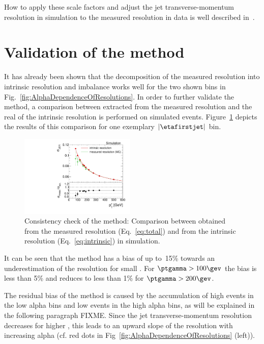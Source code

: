 How to apply these scale factors and adjust the jet transverse-momentum resolution in simulation to the measured resolution in data is well described in~\cite{bib:Matthias_Thesis}.
\FloatBarrier
\section{Validation of the method}
\label{res:sec:validation}
It has already been shown that the decomposition of the measured resolution into intrinsic resolution and imbalance works well for the two shown \ptgamma bins in Fig.~\ref{fig:AlphaDependenceOfResolutions}.
In order to further validate the method, a comparison between \jer extracted from the measured resolution and the real \jer of the intrinsic resolution is performed on simulated events. 
Figure~\ref{fig:MCClosure} depicts the results of this comparison for one exemplary $|\etafirstjet|$ bin.
\begin{figure}[!t]
  \centering
    \includegraphics[width=0.49\textwidth]{figures/resolution/methodology/MCClosure_for_1_eta_bin_RMS99.pdf}
  \caption{Consistency check of the method: Comparison between \jer obtained from the measured resolution (Eq.~\eqref{eq:total}) and from the intrinsic resolution (Eq.~\eqref{eq:intrinsic}) in simulation.}  
  \label{fig:MCClosure}
\end{figure}
It can be seen that the method has a bias of up to~15\% towards an underestimation of the resolution for small \ptgamma. 
For $\ptgamma>100\gev$ the bias is less than 5\% and reduces to less than 1\% for $\ptgamma>200\gev$.

The residual bias of the method is caused by the accumulation of high \ptfirstjet events in the low alpha bins and low \ptfirstjet events in the high alpha bins, as will be explained in the following paragraph  FIXME.
Since the jet transverse-momentum resolution decreases for higher \ptfirstjet, this leads to an upward slope of the resolution with increasing alpha (cf. red dots in Fig~\ref{fig:AlphaDependenceOfResolutions} (left)).

